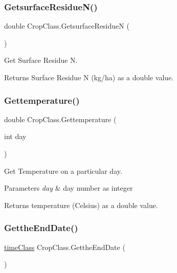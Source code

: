 \subsubsection{\texorpdfstring{GetsurfaceResidueN()}{GetsurfaceResidueN()}}
{\footnotesize\ttfamily double Crop\+Class.\+Getsurface\+ResidueN (\begin{DoxyParamCaption}{ }\end{DoxyParamCaption})\hspace{0.3cm}{\ttfamily [inline]}}



Get Surface Residue N. 

\begin{DoxyReturn}{Returns}
Surface Residue N (kg/ha) as a double value. 
\end{DoxyReturn}
\mbox{\label{class_crop_class_abf25b1d4e148fc959909d187693b20e1}} 
\subsubsection{\texorpdfstring{Gettemperature()}{Gettemperature()}}
{\footnotesize\ttfamily double Crop\+Class.\+Gettemperature (\begin{DoxyParamCaption}\item[{int}]{day }\end{DoxyParamCaption})\hspace{0.3cm}{\ttfamily [inline]}}



Get Temperature on a particular day. 


\begin{DoxyParams}{Parameters}
{\em day} & day number as integer \\
\hline
\end{DoxyParams}
\begin{DoxyReturn}{Returns}
temperature (Celsius) as a double value. 
\end{DoxyReturn}
\mbox{\label{class_crop_class_aaa5259912a66a71755997fbca4a3f6c1}} 
\subsubsection{\texorpdfstring{GettheEndDate()}{GettheEndDate()}}
{\footnotesize\ttfamily \mbox{\hyperlink{classtime_class}{time\+Class}} Crop\+Class.\+Getthe\+End\+Date (\begin{DoxyParamCaption}{ }\end{DoxyParamCaption})\hspace{0.3cm}{\ttfamily [inline]}}



